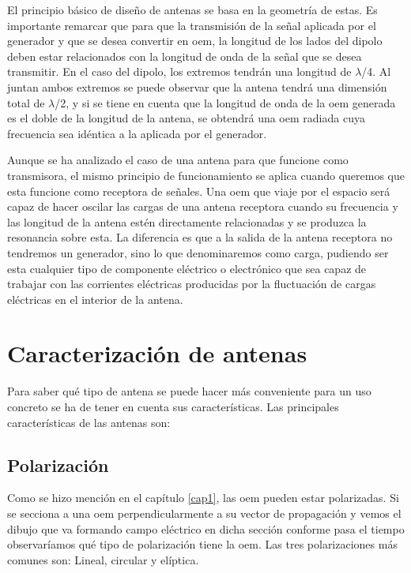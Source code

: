 \par El principio básico de diseño de antenas se basa en la geometría de estas. Es importante remarcar que para que la transmisión de la señal aplicada por el generador y que se desea convertir en \gls{oem}, la longitud de los lados del dipolo deben estar relacionados con la longitud de onda de la señal que se desea transmitir. En el caso del dipolo, los extremos tendrán una longitud de $\lambda$/4. Al juntan ambos extremos se puede observar que la antena tendrá una dimensión total de $\lambda$/2, y si se tiene en cuenta que la longitud de onda de la \gls{oem} generada es el doble de la longitud de la antena, se obtendrá una \gls{oem} radiada cuya frecuencia sea idéntica a la aplicada por el generador.
\\
\par Aunque se ha analizado el caso de una antena para que funcione como transmisora, el mismo principio de funcionamiento se aplica cuando queremos que esta funcione como receptora de señales. Una \gls{oem} que viaje por el espacio será capaz de hacer oscilar las cargas de una antena receptora cuando su frecuencia y las longitud de la antena estén directamente relacionadas y se produzca la resonancia sobre esta. La diferencia es que a la salida de la antena receptora no tendremos un generador, sino lo que denominaremos como carga, pudiendo ser esta cualquier tipo de componente eléctrico o electrónico que sea capaz de trabajar con las corrientes eléctricas producidas por la fluctuación de cargas eléctricas en el interior de la antena.

\section{Caracterización de antenas}
\par Para saber qué tipo de antena se puede hacer más conveniente para un uso concreto se ha de tener en cuenta sus características. Las principales características de las antenas son:

\subsection{Polarización}
\par Como se hizo mención en el capítulo \ref{cap1}, las \gls{oem} pueden estar polarizadas. Si se secciona a una \gls{oem} perpendicularmente a su vector de propagación y vemos el dibujo que va formando campo eléctrico en dicha sección conforme pasa el tiempo observaríamos qué tipo de polarización tiene la \gls{oem}. Las tres polarizaciones más comunes son: Lineal, circular y elíptica.

